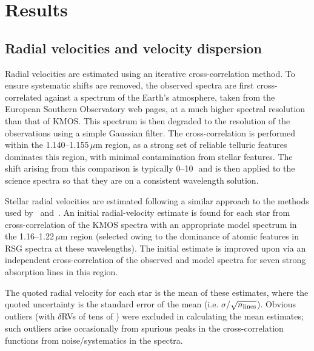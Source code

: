 \section{Results} %
\label{sec:ngc2100results}


\subsection{Radial velocities and velocity dispersion} %
\label{sub:radial_velocities}
Radial velocities are estimated using an iterative cross-correlation method.
To ensure systematic shifts are removed, the observed spectra are first cross-correlated against a spectrum of the Earth's atmosphere, taken from the European Southern Observatory web pages\footnotemark, at a much higher spectral resolution than that of KMOS.
This spectrum is then degraded to the resolution of the observations using a simple Gaussian filter.
The cross-correlation is performed within the 1.140--1.155\,$\mu$m region, as a strong set of reliable telluric features dominates this region, with minimal contamination from stellar features.
The shift arising from this comparison is typically 0--10\,\kms~and is then applied to the science spectra so that they are on a consistent wavelength solution.


Stellar radial velocities are estimated following a similar approach to the methods used by~\citet{2015ApJ...798...23L} and~\citet{2015ApJ...803...14P}. An initial radial-velocity estimate is found for each star from cross-correlation of the KMOS spectra with an appropriate model spectrum in the 1.16--1.22\,$\mu$m region
(selected owing to the dominance of atomic features in RSG spectra at these wavelengths).
The initial estimate is improved upon via an independent cross-correlation of the observed and model spectra for seven strong absorption lines in this region.

The quoted radial velocity for each star is the mean of these estimates, where the quoted uncertainty is the standard error of the mean
(i.e. $\sigma$/$\sqrt{n_{\rm lines}}$).
Obvious outliers (with $\delta$RVs of tens of \kms) were excluded in calculating the mean estimates; such outliers arise occasionally from spurious peaks in the cross-correlation functions from noise/systematics in the spectra.

